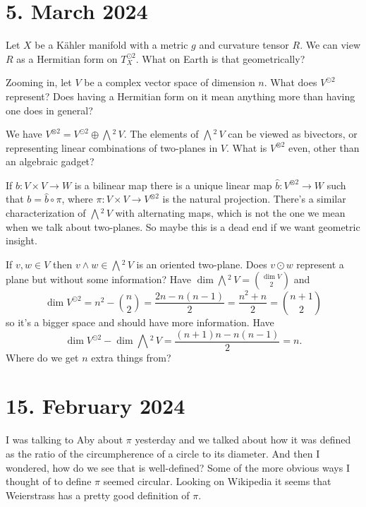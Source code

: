 \documentclass[11pt]{amsart}
\theoremstyle{definition}
\begin{document}
\section{5. March 2024}

Let $X$ be a K\"ahler manifold with a metric $g$ and curvature tensor $R$.
We can view $R$ as a Hermitian form on $T_X^{\odot 2}$.
What on Earth is that geometrically?

Zooming in, let $V$ be a complex vector space of dimension $n$. What does
$V^{\odot 2}$ represent? Does having a Hermitian form on it mean anything more
than having one does in general?

We have $V^{\otimes 2} = V^{\odot 2} \oplus \bigwedge{}^{\!\!2}\, V$.
The elements of $\bigwedge{}^{\!\!2}\, V$ can be viewed as bivectors, or
representing linear combinations of two-planes in $V$.
What is $V^{\otimes 2}$ even, other than an algebraic gadget?

If $b : V \times V \to W$ is a bilinear map there is a unique linear map $\hat
b : V^{\otimes 2} \to W$ such that $b = \hat b \circ \pi$, where $\pi : V \times
V \to V^{\otimes 2}$ is the natural projection.
There's a similar characterization of $\bigwedge{}^{\!\!2}\, V$ with
alternating maps, which is not the one we mean when we talk about two-planes.
So maybe this is a dead end if we want geometric insight.

If $v,w \in V$ then $v \wedge w \in \bigwedge{}^{\!\!2}\, V$ is an oriented
two-plane.
Does $v \odot w$ represent a plane but without some information?
Have 
$\dim \bigwedge{}^{\!\!2}\, V = \binom{\dim V}{2}$
and
$$
\dim V^{\odot 2} 
= n^2 - \binom{n}{2}
= \frac{2 n - n (n - 1)}{2}
= \frac{n^2 + n}{2}
= \binom{n+1}{2}
$$
so it's a bigger space and should have more information.
Have
$$
\dim V^{\odot 2} - \dim \bigwedge{}^{\!\!2}\, V 
= \frac{(n+1)n - n(n-1)}{2}
= n.
$$
Where do we get $n$ extra things from?


\section{15. February 2024}

I was talking to Aby about $\pi$ yesterday and we talked about how it was
defined as the ratio of the circumpherence of a circle to its diameter.
And then I wondered, how do we see that is well-defined?
Some of the more obvious ways I thought of to define $\pi$ seemed circular.
Looking on Wikipedia it seems that Weierstrass has a pretty good definition of
$\pi$.
\end{document}
